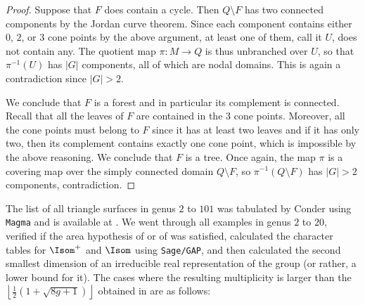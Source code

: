 \documentclass[12pt]{amsart}
\numberwithin{equation}{section}
\begin{document}
\begin{proof}
Suppose that $F$ does contain a cycle. Then $Q\setminus F$ has two connected components by the Jordan curve theorem. Since each component contains either $0$, $2$, or $3$ cone points by the above argument, at least one of them, call it $U$, does not contain any. The quotient map $\pi : M \to Q$ is thus unbranched over $U$, so that $\pi^{-1}(U)$ has $|G|$ components, all of which are nodal domains. This is again a contradiction since $|G| > 2$.

We conclude that $F$ is a forest and in particular its complement is connected. Recall that all the leaves of $F$ are contained in the $3$ cone points. Moreover, all the cone points must belong to $F$ since it has at least two leaves and if it has only two, then its complement contains exactly one cone point, which is impossible by the above reasoning. We conclude that $F$ is a tree. Once again, the map $\pi$ is a covering map over the simply connected domain $Q\setminus F$, so $\pi^{-1}(Q \setminus F)$ has $|G|>2$ components, contradiction.
\end{proof}

The list of all triangle surfaces in genus $2$ to $101$ was tabulated by Conder using \texttt{Magma} and is available at \cite{ConderList}. We went through all examples in genus $2$ to $20$, verified if the area hypothesis of \cite[Proposition 4.4]{Klein} or of  was satisfied, calculated the character tables for $\Isom^+$ and $\Isom$ using \texttt{Sage/GAP}, and then calculated the second smallest dimension of an irreducible real representation of the group (or rather, a lower bound for it). The cases where the resulting multiplicity is larger than the $\left\lfloor \frac12 \left( 1 + \sqrt{8g+1}\right) \right\rfloor$ obtained in \cite{CCV} are as follows:
  
\end{document}
